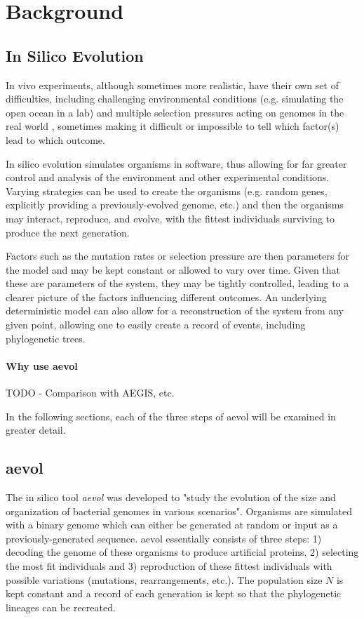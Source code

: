 \chapter{Background}\label{ch:background}

\section{In Silico Evolution}
In vivo experiments, although sometimes more realistic, have their own set of difficulties, including challenging environmental conditions (e.g. simulating the open ocean in a lab) and multiple selection pressures acting on genomes in the real world \cite{Batut.2013}, sometimes making it difficult or impossible to tell which factor(s) lead to which outcome. 

In silico evolution simulates organisms in software, thus allowing for far greater control and analysis of the environment and other experimental conditions. Varying strategies can be used to create the organisms (e.g. random genes, explicitly providing a previously-evolved genome, etc.) and then the organisms may interact, reproduce, and evolve, with the fittest individuals surviving to produce the next generation. 

Factors such as the mutation rates or selection pressure are then parameters for the model and may be kept constant or allowed to vary over time. Given that these are parameters of the system, they may be tightly controlled, leading to a clearer picture of the factors influencing different outcomes. An underlying deterministic model can also allow for a reconstruction of the system from any given point, allowing one to easily create a record of events, including phylogenetic trees. 

\subsubsection{Why use aevol}
TODO - Comparison with AEGIS\cite{Bradshaw646877}, etc. 

In the following sections, each of the three steps of aevol will be examined in greater detail.

\section{aevol}
The in silico tool \textit{aevol} was developed to "study the evolution of the size and organization of bacterial genomes in various scenarios"\cite{Batut.2013}. Organisms are simulated with a binary genome which can either be generated at random or input as a previously-generated sequence. aevol essentially consists of three steps: 1) decoding the genome of these organisms to produce artificial proteins, 2) selecting the most fit individuals and 3) reproduction of these fittest individuals with possible variations (mutations, rearrangements, etc.). The population size $N$ is kept constant and a record of each generation is kept so that the phylogenetic lineages can be recreated.


